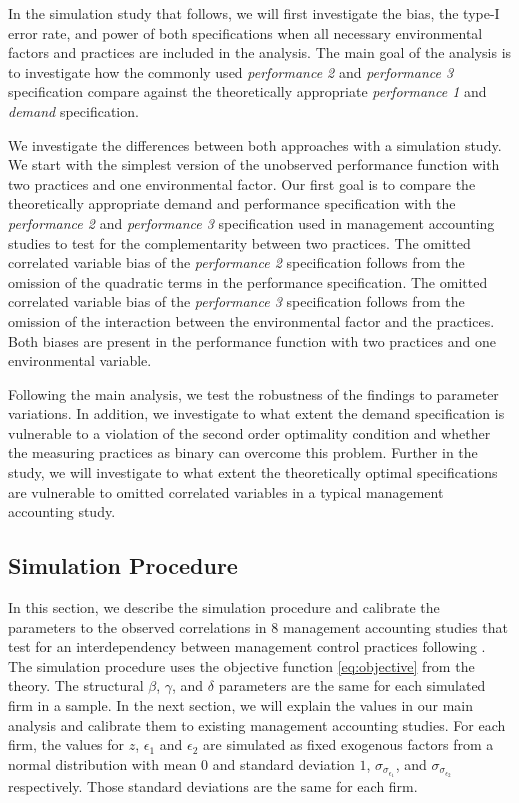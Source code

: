 \documentclass[12pt]{article}
\begin{document}
In the simulation study that follows, we will first investigate the bias, the type-I error rate, and power of both specifications when all necessary environmental factors and practices are included in the analysis. The main goal of the analysis is to investigate how the commonly used \emph{performance 2} and \emph{performance 3} specification compare against the theoretically appropriate \emph{performance 1} and \emph{demand} specification.

We investigate the differences between both approaches with a simulation study. We start with the simplest version of the unobserved performance function with two practices and one environmental factor. Our first goal is to compare the theoretically appropriate demand and performance specification with the \emph{performance 2} and \emph{performance 3} specification used in management accounting studies to test for the complementarity between two practices. The omitted correlated variable bias of  the \emph{performance 2} specification follows from the omission of the quadratic terms in the performance specification. The omitted correlated variable bias of the \emph{performance 3} specification follows from the omission of the interaction between the environmental factor and the practices. Both biases are present in the performance function with two practices and one environmental variable. 

Following the main analysis, we test the robustness of the findings to parameter variations. In addition, we investigate to what extent the demand specification is vulnerable to a violation of the second order optimality condition and whether the measuring practices as binary can overcome this problem. Further in the study, we will investigate to what extent the theoretically optimal specifications are vulnerable to omitted correlated variables in a typical management accounting study. 

\subsection{Simulation Procedure}

In this section, we describe the simulation procedure and calibrate the parameters to the observed correlations in 8 management accounting studies that test for an interdependency between management control practices following \citet{Grabner2013}. The simulation procedure uses the objective function \eqref{eq:objective} from the theory.  The structural $\beta$, $\gamma$, and $\delta$ parameters are the same for each simulated firm in a sample. In the next section, we will explain the values in our main analysis and calibrate them to existing management accounting studies. For each firm, the values for $z$, $\epsilon_1$ and $\epsilon_2$ are simulated as fixed exogenous factors from a normal distribution with mean $0$ and standard deviation $1$,  $\sigma_{\sigma_{\epsilon_1}}$, and $\sigma_{\sigma_{\epsilon_2}}$ respectively. Those standard deviations are the same for each firm. 
\end{document}
